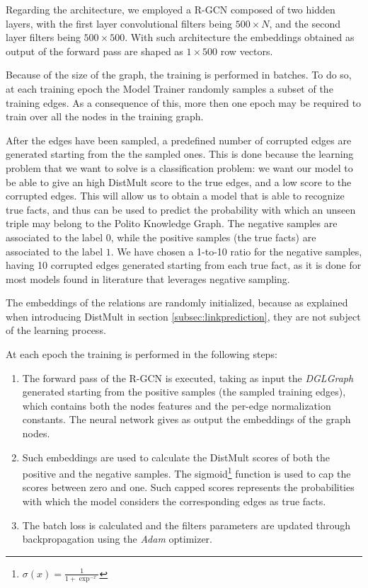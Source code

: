 \documentclass[%
    corpo=13.5pt,
    twoside,
    oldstyle,
    tipotesi=magistrale,
    greek,
    evenboxes
]{toptesi}
\begin{document}
Regarding the architecture, we employed a R-GCN composed of two hidden layers,
with the first layer convolutional filters being $500 \times N$, and the second
layer filters being $500 \times 500$.
With such architecture the embeddings obtained as output of the forward pass
are shaped as $1 \times 500$ row vectors.

Because of the size of the graph, the training is performed in batches.
To do so, at each training epoch the Model Trainer randomly samples a subset
of the training edges.
As a consequence of this, more then one epoch may be required to train over all
the nodes in the training graph.

After the edges have been sampled, a predefined number of corrupted edges are
generated starting from the the sampled ones. This is done because the learning
problem that we want to solve is a classification problem: we want our
model to be able to give an high DistMult score to the true edges, and a
low score to the corrupted edges.
This will allow us to obtain a model that is able to recognize true facts, and
thus can be used to predict the probability with which an unseen triple
may belong to the Polito Knowledge Graph.
The negative samples are associated to the label $0$, while the positive samples
(the true facts) are associated to the label $1$.
We have chosen a 1-to-10 ratio for the negative samples, having 10 corrupted
edges generated starting from each true fact, as it is done for most models
found in literature that leverages negative sampling.

The embeddings of the relations are randomly initialized, because as explained
when introducing DistMult in section \ref{subsec:linkprediction}, they are not
subject of the learning process.

At each epoch the training is performed in the following steps:

\begin{enumerate}
    \item The forward pass of the R-GCN is executed, taking as input the
        \emph{DGLGraph} generated starting from the positive samples
        (the sampled training edges), which contains both
        the nodes features and the per-edge normalization constants.
        The neural network gives as output the embeddings of the graph nodes.
    \item Such embeddings are used to calculate the DistMult scores
        of both the positive and the negative samples.
        The sigmoid\footnote{
            $\sigma(x) = \frac{1}{1+\exp^{-x}}$
        }
        function is used to cap the scores between zero and one. Such capped
        scores represents the probabilities with which the model considers the
        corresponding edges as true facts.
    \item The batch loss is calculated and the filters parameters are updated
        through backpropagation using the \emph{Adam} optimizer.
\end{enumerate}
\end{document}
